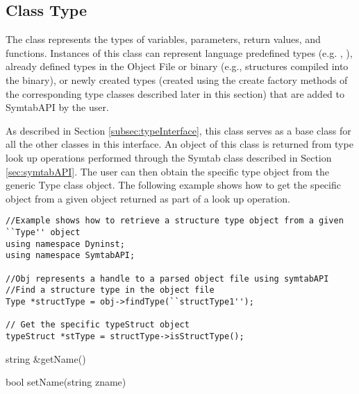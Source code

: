 \subsection{Class Type}

The class  represents the types of variables, parameters, return values, and functions. Instances of this class can represent language predefined types (e.g. , ), already defined types in the Object File or binary (e.g., structures compiled into the binary), or newly created types (created using the create factory methods of the corresponding type classes described later in this section) that are added to SymtabAPI by the user. 

As described in Section \ref{subsec:typeInterface}, this class serves as a base class for all the other classes in this interface. An object of this class is returned from type look up operations performed through the Symtab class described in Section \ref{sec:symtabAPI}. The user can then obtain the specific type object from the generic Type class object. The following example shows how to get the specific object from a given  object returned as part of a look up operation.

\begin{lstlisting}
//Example shows how to retrieve a structure type object from a given ``Type'' object
using namespace Dyninst;
using namespace SymtabAPI;

//Obj represents a handle to a parsed object file using symtabAPI
//Find a structure type in the object file
Type *structType = obj->findType(``structType1'');

// Get the specific typeStruct object
typeStruct *stType = structType->isStructType();
\end{lstlisting}

\begin{apient}
string &getName()
\end{apient}

\begin{apient}
bool setName(string zname)
\end{apient}

